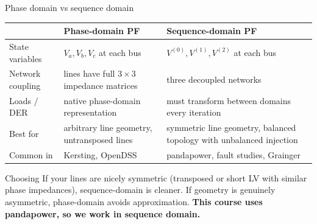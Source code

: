 \documentclass[aspectratio=169,10pt]{beamer}
\begin{document}
\begin{frame}{Phase domain vs sequence domain}
\centering
\scriptsize
\begin{tabular}{@{}p{}p{}p{}@{}}
\toprule
 & \textbf{Phase-domain PF} & \textbf{Sequence-domain PF} \\
\midrule
State variables & $V_a, V_b, V_c$ at each bus & $V^{(0)}, V^{(1)}, V^{(2)}$ at each bus \\
Network coupling & lines have full $3\times 3$ impedance matrices & three decoupled networks \\
Loads / DER & native phase-domain representation & must transform between domains every iteration \\
Best for & arbitrary line geometry, untransposed lines & symmetric line geometry, balanced topology with unbalanced injection \\
Common in & Kersting, OpenDSS & pandapower, fault studies, Grainger \\
\bottomrule
\end{tabular}
\vspace{0.6em}
\begin{block}{Choosing}
If your lines are nicely symmetric (transposed or short LV with similar phase impedances), sequence-domain is cleaner. If geometry is genuinely asymmetric, phase-domain avoids approximation. \textbf{This course uses pandapower, so we work in sequence domain.}
\end{block}
\end{frame}
\end{document}
